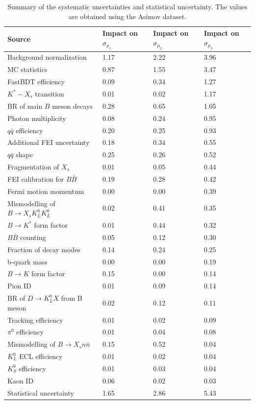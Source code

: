 \begin{table}
\caption{Summary of the systematic uncertainties and statistical uncertainty. The values are obtained using the Asimov dataset.}
  \renewcommand{\arraystretch}{1.4}
  \centering
\begin{tabular}{ p{6cm} p{2.5cm} p{2.5cm} p{2.5cm}}
 \hline
  \hline
Source &  Impact on $\sigma_{\mu_{1}}$ & Impact on $\sigma_{\mu_{2}}$ & Impact on $\sigma_{\mu_{3}}$\\
 \hline
Background normalization & 1.17 & 2.22 & 3.96 \\
MC statistics & 0.87 & 1.55 & 3.47 \\
FastBDT efficiency & 0.09 & 0.34 & 1.27 \\
$K^{*}-X_{s}$ transition & 0.01 & 0.02 & 1.17 \\
BR of main $B$ meson decays & 0.28 & 0.65 & 1.05 \\
Photon multiplicity & 0.08 & 0.24 & 0.95 \\
$q\bar{q}$ efficiency & 0.20 & 0.25 & 0.93 \\
Additional FEI uncertainty & 0.18 & 0.34 & 0.55 \\
$q\bar{q}$ shape & 0.25 & 0.26 & 0.52 \\
Fragmentation of $X_{s}$ & 0.01 & 0.05 & 0.44 \\
FEI calibration for $B\bar{B}$ & 0.19 & 0.28 & 0.42 \\
Fermi motion momentum & 0.00 & 0.00 & 0.39 \\
Mismodelling of $B \rightarrow X_{s} K_{L}^{0} K_{L}^{0}$ & 0.02 & 0.41 & 0.35 \\
$B\rightarrow K^{*}$ form factor & 0.01 & 0.44 & 0.32 \\
$B\bar{B}$ counting & 0.05 & 0.12 & 0.30 \\
Fraction of decay modes & 0.14 & 0.24 & 0.25 \\
b-quark mass & 0.00 & 0.00 & 0.19 \\
$B\rightarrow K$ form factor & 0.15 & 0.00 & 0.14 \\
Pion ID & 0.01 & 0.09 & 0.14 \\
BR of $D \rightarrow K_{L}^{0} X$ from B meson & 0.02 & 0.12 & 0.11 \\
Tracking efficiency & 0.01 & 0.02 & 0.09 \\
$\pi^{0}$ efficiency & 0.01 & 0.04 & 0.08 \\
Mismodelling of $B\rightarrow X_{s} n\bar{n}$ & 0.15 & 0.52 & 0.04 \\
$K_{L}^{0}$ ECL efficiency & 0.01 & 0.02 & 0.04 \\
$K_{S}^{0}$ efficiency & 0.01 & 0.03 & 0.04 \\
Kaon ID & 0.06 & 0.02 & 0.03 \\
\hline
Statistical uncertainty & 1.65 & 2.86 & 5.43 \\
         \hline
            \hline
\end{tabular}
    \label{tab:uncertaintiestable}
\end{table}

